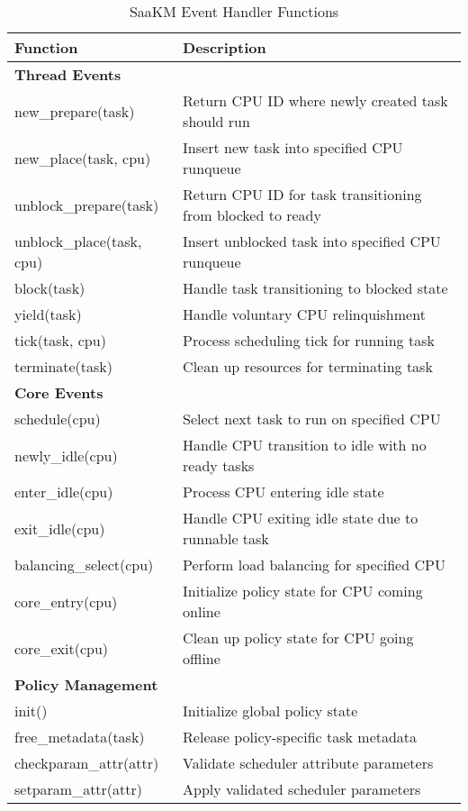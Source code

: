 \begin{table}[htbp!]
    \caption{SaaKM Event Handler Functions}
    \begin{tabular}{|l|p{6.5cm}|}
        \hline
        \textbf{Function} & \textbf{Description} \\
        \hline
        \multicolumn{2}{|l|}{\textbf{Thread Events}} \\
        \hline
        new\_prepare(task) & Return CPU ID where newly created task should run \\
        new\_place(task, cpu) & Insert new task into specified CPU runqueue \\
        unblock\_prepare(task) & Return CPU ID for task transitioning from blocked to ready \\
        unblock\_place(task, cpu) & Insert unblocked task into specified CPU runqueue \\
        block(task) & Handle task transitioning to blocked state \\
        yield(task) & Handle voluntary CPU relinquishment \\
        tick(task, cpu) & Process scheduling tick for running task \\
        terminate(task) & Clean up resources for terminating task \\
        \hline
        \multicolumn{2}{|l|}{\textbf{Core Events}} \\
        \hline
        schedule(cpu) & Select next task to run on specified CPU \\
        newly\_idle(cpu) & Handle CPU transition to idle with no ready tasks \\
        enter\_idle(cpu) & Process CPU entering idle state \\
        exit\_idle(cpu) & Handle CPU exiting idle state due to runnable task \\
        balancing\_select(cpu) & Perform load balancing for specified CPU \\
        core\_entry(cpu) & Initialize policy state for CPU coming online \\
        core\_exit(cpu) & Clean up policy state for CPU going offline \\
        \hline
        \multicolumn{2}{|l|}{\textbf{Policy Management}} \\
        \hline
        init() & Initialize global policy state \\
        free\_metadata(task) & Release policy-specific task metadata \\
        checkparam\_attr(attr) & Validate scheduler attribute parameters \\
        setparam\_attr(attr) & Apply validated scheduler parameters \\
        \hline
    \end{tabular}
    \label{tab:saakm-callbacks}
\end{table}

